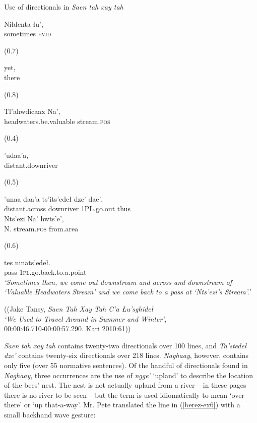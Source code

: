 \begin{exe}
\ex Use of directionals in \textit{Saen tah xay tah} \label{ex:key:5}
\begin{xlistn}
 \gll 		Niłdenta	łu’,\\
		sometimes	\textsc{evid}\\
\sn \begin{flushright}(0.7)\end{flushright}
 \gll 				yet,\\
		there\\
\sn \begin{flushright}(0.8)\end{flushright}
	\gll 			Tl’ahwdicaax 			Na’, \\
		headwaters.be.valuable	stream.\textsc{pos}\\
\sn \begin{flushright}(0.4)\end{flushright}
	\gll 			’udaa’a,\\
		distant.downriver \\
\sn \begin{flushright}(0.5)\end{flushright}
	\gll 			’unaa			daa’a		ts’its’edeł	dze’	dae’, \\
		distant.across	downriver	1PL.go.out			thus\\
	\gll 			Nts’ezi		Na’			hwts’e’, \\
		N.			stream.\textsc{pos}	from.area\\
\sn \begin{flushright}(0.6)\end{flushright}
	\gll 			tes 		ninats’edeł.\\
		pass		1\textsc{pl}.go.back.to.a.point\\
\glt \textit{‘Sometimes then, we come out downstream and across and downstream of ‘Valuable Headwaters Stream’ and we come back to a pass at ‘Nts’ezi’s Stream’.’}
\end{xlistn}

\begin{flushright}
((Jake Tansy, \textit{Saen Tah Xay Tah C’a Łu’sghideł}\\
\textit{‘We Used to Travel Around in Summer and Winter’},\\
00:00:46.710-00:00:57.290. Kari 2010:61))
\end{flushright}
\end{exe}

\textit{Saen} \textit{tah} \textit{xay} \textit{tah} contains twenty-two directionals over 100 lines, and \textit{Ta’stedeł} \textit{dze’} contains twenty-six directionals over 218 lines. \textit{Naghaay}, however, contains only five (over 55 normative sentences). Of the handful of directionals found in \textit{Naghaay}, three occurrences are the use of \textit{ngge’} ‘upland’ to describe the location of the bees’ nest. The nest is not actually upland from a river – in these pages there is no river to be seen – but the term is used idiomatically to mean ‘over there’ or ‘up that-a-way’. Mr. Pete translated the line in (\ref{berez-ex6}) with a small backhand wave gesture:


